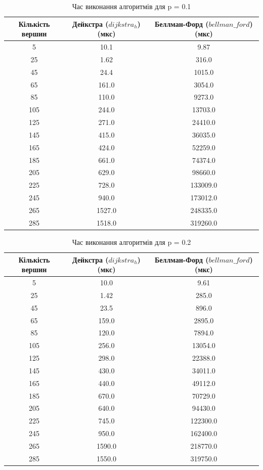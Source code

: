 \documentclass[a4paper,12pt]{article}
\begin{document}
\begin{table}[ht]
    \centering
    \caption{Час виконання алгоритмів для p = 0.1}
    \begin{tabular}{|c|c|c|}
        \hline
        Кількість вершин & Дейкстра ($dijkstra_h$) (мкс) & Беллман-Форд ($bellman\_ford$) (мкс) \\
        \hline
        5   & 10.1    & 9.87 \\
        25  & 1.62    & 316.0 \\
        45  & 24.4    & 1015.0 \\
        65  & 161.0   & 3054.0 \\
        85  & 110.0   & 9273.0 \\
        105 & 244.0   & 13703.0 \\
        125 & 271.0   & 24410.0 \\
        145 & 415.0   & 36035.0 \\
        165 & 424.0   & 52259.0 \\
        185 & 661.0   & 74374.0 \\
        205 & 629.0   & 98660.0 \\
        225 & 728.0   & 133009.0 \\
        245 & 940.0   & 173012.0 \\
        265 & 1527.0  & 248335.0 \\
        285 & 1518.0  & 319260.0 \\
        \hline
    \end{tabular}
    \label{tab:data_0.1}
\end{table}

\begin{table}[ht]
    \centering
    \caption{Час виконання алгоритмів для p = 0.2}
    \begin{tabular}{|c|c|c|}
        \hline
        Кількість вершин & Дейкстра ($dijkstra_h$) (мкс) & Беллман-Форд ($bellman\_ford$) (мкс) \\
        \hline
        5   & 10.0    & 9.61 \\
        25  & 1.42    & 285.0 \\
        45  & 23.5    & 896.0 \\
        65  & 159.0   & 2895.0 \\
        85  & 120.0   & 7894.0 \\
        105 & 256.0   & 13054.0 \\
        125 & 298.0   & 22388.0 \\
        145 & 430.0   & 34011.0 \\
        165 & 440.0   & 49112.0 \\
        185 & 670.0   & 70729.0 \\
        205 & 640.0   & 94430.0 \\
        225 & 745.0   & 122300.0 \\
        245 & 950.0   & 162400.0 \\
        265 & 1590.0  & 218770.0 \\
        285 & 1550.0  & 319750.0 \\
        \hline
    \end{tabular}
    \label{tab:data_0.2}
\end{table}
\end{document}
